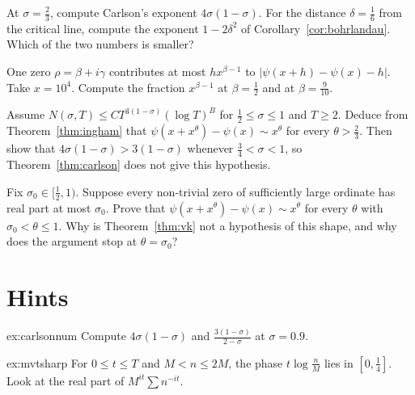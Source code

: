 \begin{exercise}[$\star$]\label{ex:v14-extra-01-1}
At $\sigma=\frac23$, compute Carlson's exponent $4\sigma(1-\sigma)$. For the distance $\delta=\frac16$ from the critical line, compute the exponent $1-2\delta^2$ of Corollary~\ref{cor:bohrlandau}. Which of the two numbers is smaller?
\end{exercise}

\begin{exercise}[$\star$]\label{ex:v14-extra-01-2}
One zero $\rho=\beta+i\gamma$ contributes at most $hx^{\beta-1}$ to $|\psi(x+h)-\psi(x)-h|$. Take $x=10^4$. Compute the fraction $x^{\beta-1}$ at $\beta=\frac12$ and at $\beta=\frac9{10}$.
\end{exercise}

\begin{exercise}[$\star\star$]\label{ex:v14-extra-01-3}
Assume $N(\sigma,T)\le CT^{3(1-\sigma)}(\log T)^B$ for $\frac12\le\sigma\le1$ and $T\ge2$. Deduce from Theorem~\ref{thm:ingham} that $\psi(x+x^\theta)-\psi(x)\sim x^\theta$ for every $\theta>\frac23$. Then show that $4\sigma(1-\sigma)>3(1-\sigma)$ whenever $\frac34<\sigma<1$, so Theorem~\ref{thm:carlson} does not give this hypothesis.
\end{exercise}

\begin{exercise}[$\star\star\star$]\label{ex:v14-extra-01-4}
Fix $\sigma_0\in\bigl[\frac12,1\bigr)$. Suppose every non-trivial zero of sufficiently large ordinate has real part at most $\sigma_0$. Prove that $\psi(x+x^\theta)-\psi(x)\sim x^\theta$ for every $\theta$ with $\sigma_0<\theta\le1$. Why is Theorem~\ref{thm:vk} not a hypothesis of this shape, and why does the argument stop at $\theta=\sigma_0$?
\end{exercise}

\section{Hints}

\begin{hint}{ex:carlsonnum}
Compute $4\sigma(1-\sigma)$ and $\frac{3(1-\sigma)}{2-\sigma}$ at $\sigma=0.9$.
\end{hint}

\begin{hint}{ex:mvtsharp}
For $0\le t\le T$ and $M<n\le2M$, the phase $t\log\frac nM$ lies in $[0,\frac14]$. Look at the real part of $M^{it}\sum n^{-it}$.
\end{hint}

